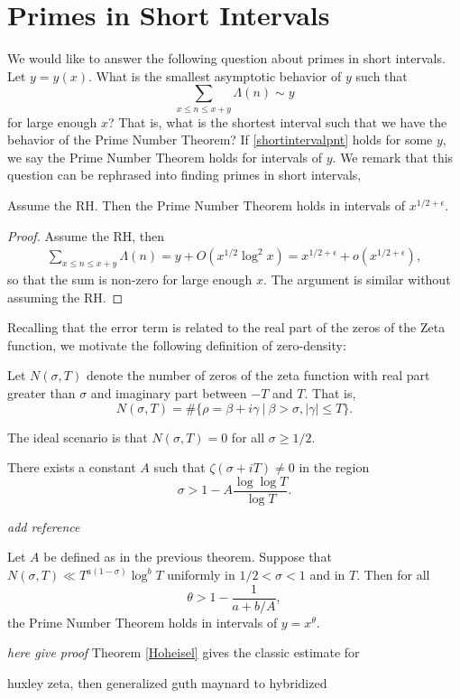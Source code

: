 \section{Primes in Short Intervals}
We would like to answer the following question about primes in short intervals. Let $y=y(x)$. What is the smallest asymptotic behavior of $y$
such that \begin{equation}\label{shortintervalpnt}
\sum_{x\leq n \leq x+y} \Lambda(n) \sim y
\end{equation}
for large enough $x$? That is, what is the shortest interval such that we have the behavior of the Prime Number Theorem? If \ref{shortintervalpnt} holds for some $y$,
we say the Prime Number Theorem holds for intervals of $y$.
We remark that this question can be rephrased into finding primes in short intervals, 
\begin{proposition}
    Assume the RH. Then the Prime Number Theorem holds in intervals of $x^{1/2+\epsilon}$.
\end{proposition}
\begin{proof}
    Assume the RH, then
    \begin{align*}
        \sum_{x\leq n \leq x+y} \Lambda(n)=
        y+O(x^{1/2}\log^2 x) = x^{1/2+\epsilon} + o(x^{1/2+\epsilon}),
    \end{align*}
    so that the sum is non-zero for large enough $x$. The argument is similar without assuming the RH.
\end{proof}
Recalling that the error term is related to the real part of the zeros of the Zeta function, we motivate the following definition of zero-density:
\begin{definition}
    Let $N(\sigma, T)$ denote the number of zeros of the zeta function with real part greater than $\sigma$ and imaginary part between $-T$ and $T$. That is,\[
        N(\sigma,T) = \# \{\rho = \beta + i\gamma \ | \ \beta >\sigma, |\gamma|\leq T\}.
    \]
\end{definition}
\begin{remark}
    The ideal scenario is that $N(\sigma,T)=0$ for all $\sigma\geq 1/2$. 
\end{remark}
\begin{theorem}[Chudakov] 
    There exists a constant $A$ such that $\zeta(\sigma+iT)\neq 0$ in the region \begin{equation*}
        \sigma > 1 - A\frac{\log \log T}{\log T}.
    \end{equation*}
\end{theorem}
\textit{add reference}
\begin{theorem}[Hoheisel] \label{Hoheisel}
    Let $A$ be defined as in the previous theorem.
    Suppose that $N(\sigma, T)\ll T^{a(1-\sigma)}\log^b T$ uniformly in $1/2<\sigma<1$ and in $T$. Then for all \[
        \theta > 1 - \frac{1}{a+b/A},
    \] the Prime Number Theorem holds in 
    intervals of $y=x^\theta$.
\end{theorem}

\textit{here give proof}
Theorem \ref{Hoheisel} gives the classic estimate for 

huxley zeta, then generalized guth maynard to hybridized 